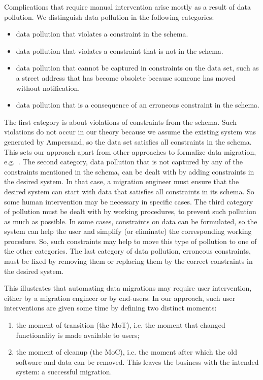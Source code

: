 \documentclass[runningheads]{llncs}
\begin{document}
   Complications that require manual intervention arise mostly as a result of data pollution.
   We distinguish data pollution in the following categories:
\begin{itemize}
   \item data pollution that violates a constraint in the schema.
   \item data pollution that violates a constraint that is not in the schema.
   \item data pollution that cannot be captured in constraints on the data set,
   such as a street address that has become obsolete because someone has moved without notification.
   \item data pollution that is a consequence of an erroneous constraint in the schema.
\end{itemize}
   The first category is about violations of constraints from the schema.
   Such violations do not occur in our theory because we assume the existing system was generated by Ampersand,
   so the data set satisfies all constraints in the schema.
   This sets our approach apart from other approaches to formalize data migration, e.g.~\cite{Thalheim2013}.
   The second category, data pollution that is not captured by any of the constraints mentioned in the schema,
   can be dealt with by adding constraints in the desired system.
   In that case, a migration engineer must ensure that the desired system can start with data that satisfies all constraints in its schema.
   So some human intervention may be necessary in specific cases.
   The third category of pollution must be dealt with by working procedures, to prevent such pollution as much as possible.
   In some cases, constraints on data can be formulated,
   so the system can help the user and simplify (or eliminate) the corresponding working procedure.
   So, such constraints may help to move this type of pollution to one of the other categories.
   The last category of data pollution, erroneous constraints, must be fixed by removing them or replacing them by the correct constraints in the desired system.

   This illustrates that automating data migrations may require user intervention,
   either by a migration engineer or by end-users.
   In our approach, such user interventions are given some time by
   defining two distinct moments:
\begin{enumerate}
   \item the moment of transition (the MoT), i.e. the moment that changed functionality is made available to users;
   \item the moment of cleanup (the MoC), i.e. the moment after which the old software and data can be removed.
   This leaves the business with the intended system: a successful migration.
\end{enumerate}
\end{document}
